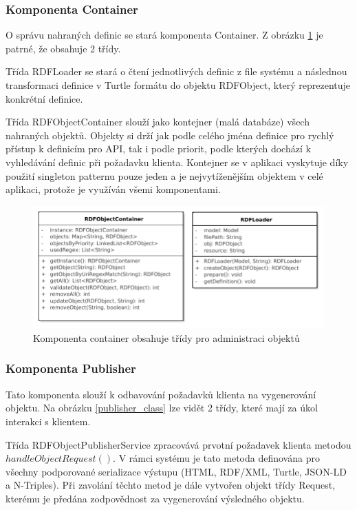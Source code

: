 \documentclass[thesis=B,czech]{FITthesis}[2012/06/26]
\begin{document}
 \subsubsection{Komponenta Container} \label{component_container}
 O správu nahraných definic se stará komponenta Container. Z obrázku \ref{container_class} je patrné, že obsahuje 2 třídy.
 
 Třída RDFLoader se stará
 o čtení jednotlivých definic z file systému a následnou transformaci definice v Turtle formátu do objektu RDFObject,
 který reprezentuje konkrétní definice.
 
 Třída RDFObjectContainer slouží jako kontejner (malá databáze) všech nahraných objektů. Objekty si drží jak podle celého jména definice pro rychlý přístup
 k definicím pro API, tak i podle priorit, podle kterých dochází k vyhledávání definic při požadavku klienta.
 Kontejner se v aplikaci vyskytuje díky použití singleton patternu
 pouze jeden a je nejvytíženějším objektem v celé aplikaci, protože je využíván všemi komponentami.
 
 \begin{figure}\centering
 	\includegraphics[width=\textwidth]{Container.pdf}
 	\caption[Model tříd komponenty container]{Komponenta container obsahuje třídy pro administraci objektů}\label{container_class}
    \end{figure}
    
    \subsubsection{Komponenta Publisher}
    Tato komponenta slouží k odbavování požadavků klienta na vygenerování objektu. Na obrázku \ref{publisher_class} lze vidět 2 třídy,
    které mají za úkol interakci s klientem.
    
    Třída RDFObjectPublisherService zpracovává prvotní požadavek klienta metodou $handleObjectRequest()$. V rámci systému je tato metoda definována
    pro všechny podporované serializace výstupu (HTML, RDF/XML, Turtle, JSON-LD a N-Triples). Při zavolání těchto metod je dále vytvořen 
    objekt třídy Request, kterému je předána zodpovědnost za vygenerování výsledného objektu. 
    
\end{document}
